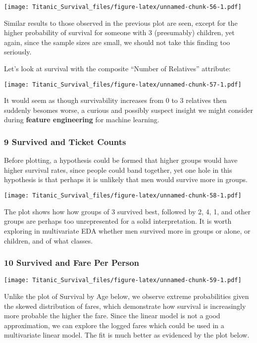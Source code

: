 \documentclass[]{article}
\begin{document}
\texttt{[image: Titanic\_Survival\_files/figure-latex/unnamed-chunk-56-1.pdf]}

Similar results to those observed in the previous plot are seen, except
for the higher probability of survival for someone with 3 (presumably)
children, yet again, since the sample sizes are small, we should not
take this finding too seriously.

Let's look at survival with the composite ``Number of Relatives''
attribute:

\texttt{[image: Titanic\_Survival\_files/figure-latex/unnamed-chunk-57-1.pdf]}

It would seem as though survivability increases from 0 to 3 relatives
then suddenly besomes worse, a curious and possibly suspect insight we
might consider during \textbf{feature engineering} for machine learning.

\subsubsection{9 Survived and Ticket
Counts}\label{survived-and-ticket-counts}

Before plotting, a hypothesis could be formed that higher groups would
have higher survival rates, since people could band together, yet one
hole in this hypothesis is that perhaps it is unlikely that men would
survive more in groups.

\texttt{[image: Titanic\_Survival\_files/figure-latex/unnamed-chunk-58-1.pdf]}

The plot shows how how groups of 3 survived best, followed by 2, 4, 1,
and other groups are perhaps too unrepresented for a solid
interpretation. It is worth exploring in multivariate EDA whether men
survived more in groups or alone, or children, and of what classes.

\subsubsection{10 Survived and Fare Per
Person}\label{survived-and-fare-per-person}

\texttt{[image: Titanic\_Survival\_files/figure-latex/unnamed-chunk-59-1.pdf]}

Unlike the plot of Survival by Age below, we observe extreme
probabilities given the skewed distribution of fares, which demonstrate
how survival is increasingly more probable the higher the fare. Since
the linear model is not a good approximation, we can explore the logged
fares which could be used in a multivariate linear model. The fit is
much better as evidenced by the plot below.
\end{document}

